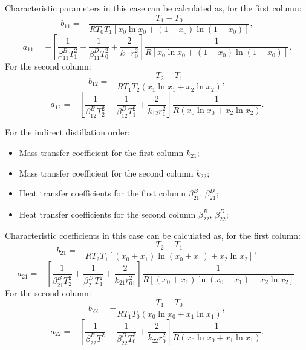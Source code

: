 \documentclass[12pt]{article}
\begin{document}
Characteristic parameters in this case can be calculated as, for the first column:
\begin{equation}
b_{11} = -\frac{T_1 - T_0}{RT_0T_1\left[x_0\ln{x_0} + (1-x_0)\ln{(1-x_0)}\right]},
\label{eq:b1c1v}
\end{equation}
\begin{equation}
a_{11} = -\left[\frac{1}{\beta^B_{11}T_1^2} + \frac{1}{\beta^D_{11}T_0^2} + \frac{2}{k_{11}r_0^2}\right]\frac{1}{R\left[x_0\ln{x_0} + (1-x_0)\ln{(1-x_0)}\right]}.
\label{eq:a1c1v}
\end{equation}
For the second column:
\begin{equation}
b_{12} = -\frac{T_2 - T_1}{RT_1T_2(x_1\ln{x_1} + x_2\ln{x_2})},
\label{eq:b2c1v}
\end{equation}
\begin{equation}
a_{12} = -\left[\frac{1}{\beta^B_{12}T_2^2} + \frac{1}{\beta^D_{12}T_1^2} + \frac{2}{k_{12}r_1^2}\right]\frac{1}{R(x_0\ln{x_0} + x_2\ln{x_2})}.
\label{eq:a2c1v}
\end{equation}

For the indirect distillation order:
\begin{itemize}
\item Mass transfer coefficient for the first column $k_{21}$;
\item Mass transfer coefficient for the second column $k_{22}$;
\item Heat transfer coefficients for the first column $\beta^B_{21}$, $\beta^D_{21}$;
\item Heat transfer coefficients for the second column $\beta^B_{22}$, $\beta^D_{22}$;
\end{itemize}

Characteristic coefficients in this case can be calculated as, for the first column:
\begin{equation}
b_{21} = -\frac{T_2 - T_1}{RT_2T_1\left[(x_0+x_1)\ln{(x_0+x_1)} + x_2\ln{x_2}\right]},
\label{eq:b1c2v}
\end{equation}
\begin{equation}
a_{21} = -\left[\frac{1}{\beta^B_{21}T_2^2} + \frac{1}{\beta^D_{21}T_1^2} + \frac{2}{k_{21}r_{01}^2}\right]\frac{1}{R\left[(x_0+x_1)\ln{(x_0+x_1)} + x_2\ln{x_2}\right]}.
\label{eq:a1c2v}
\end{equation}
For the second column:
\begin{equation}
b_{22} = -\frac{T_1 - T_0}{RT_1T_0(x_0\ln{x_0} + x_1\ln{x_1})},
\label{eq:b2c2v}
\end{equation}
\begin{equation}
a_{22} = -\left[\frac{1}{\beta^B_{22}T_1^2} + \frac{1}{\beta^D_{22}T_0^2} + \frac{2}{k_{22}r_0^2}\right]\frac{1}{R(x_0\ln{x_0} + x_1\ln{x_1})}.
\label{eq:a2c2v}
\end{equation}
\end{document}
